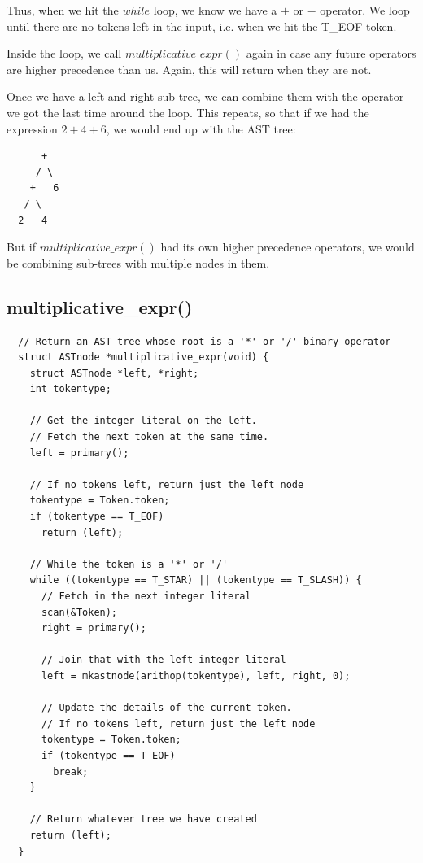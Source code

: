 \documentclass[a4paper,12pt]{article}
\begin{document}
Thus, when we hit the $while$ loop, we know we have a $+$ or $-$ operator. We loop until there are no tokens left in the input, i.e. when we hit the T\_EOF token.

Inside the loop, we call $multiplicative\_expr()$ again in case any future operators are higher precedence than us. Again, this will return when they are not.

Once we have a left and right sub-tree, we can combine them with the operator we got the last time around the loop. This repeats, so that if we had the expression $2+4+6$, we would end up with the AST tree:

\begin{lstlisting}
      +
     / \
    +   6
   / \
  2   4
\end{lstlisting}

But if $multiplicative\_expr()$ had its own higher precedence operators, we would be combining sub-trees with multiple nodes in them.

\subsection{multiplicative\_expr()}

\begin{lstlisting}
  // Return an AST tree whose root is a '*' or '/' binary operator
  struct ASTnode *multiplicative_expr(void) {
    struct ASTnode *left, *right;
    int tokentype;
  
    // Get the integer literal on the left.
    // Fetch the next token at the same time.
    left = primary();
  
    // If no tokens left, return just the left node
    tokentype = Token.token;
    if (tokentype == T_EOF)
      return (left);
  
    // While the token is a '*' or '/'
    while ((tokentype == T_STAR) || (tokentype == T_SLASH)) {
      // Fetch in the next integer literal
      scan(&Token);
      right = primary();
  
      // Join that with the left integer literal
      left = mkastnode(arithop(tokentype), left, right, 0);
  
      // Update the details of the current token.
      // If no tokens left, return just the left node
      tokentype = Token.token;
      if (tokentype == T_EOF)
        break;
    }
  
    // Return whatever tree we have created
    return (left);
  }
\end{lstlisting}
\end{document}
